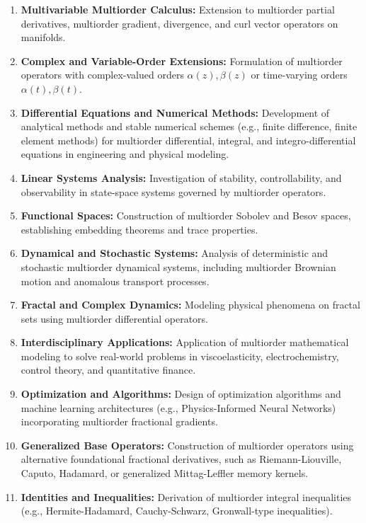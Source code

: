 \documentclass[oneside,10pt]{article}
\theoremstyle{plain}
\theoremstyle{definition}
\begin{document}
\begin{enumerate}
    \item \textbf{Multivariable Multiorder Calculus:} Extension to multiorder partial derivatives, multiorder gradient, divergence, and curl vector operators on manifolds.
    \item \textbf{Complex and Variable-Order Extensions:} Formulation of multiorder operators with complex-valued orders $\alpha(z), \beta(z)$ or time-varying orders $\alpha(t), \beta(t)$.
    \item \textbf{Differential Equations and Numerical Methods:} Development of analytical methods and stable numerical schemes (e.g., finite difference, finite element methods) for multiorder differential, integral, and integro-differential equations in engineering and physical modeling.
    \item \textbf{Linear Systems Analysis:} Investigation of stability, controllability, and observability in state-space systems governed by multiorder operators.
    \item \textbf{Functional Spaces:} Construction of multiorder Sobolev and Besov spaces, establishing embedding theorems and trace properties.
    \item \textbf{Dynamical and Stochastic Systems:} Analysis of deterministic and stochastic multiorder dynamical systems, including multiorder Brownian motion and anomalous transport processes.
    \item \textbf{Fractal and Complex Dynamics:} Modeling physical phenomena on fractal sets using multiorder differential operators.
    \item \textbf{Interdisciplinary Applications:} Application of multiorder mathematical modeling to solve real-world problems in viscoelasticity, electrochemistry, control theory, and quantitative finance.
    \item \textbf{Optimization and Algorithms:} Design of optimization algorithms and machine learning architectures (e.g., Physics-Informed Neural Networks) incorporating multiorder fractional gradients.
    \item \textbf{Generalized Base Operators:} Construction of multiorder operators using alternative foundational fractional derivatives, such as Riemann-Liouville, Caputo, Hadamard, or generalized Mittag-Leffler memory kernels.
    \item \textbf{Identities and Inequalities:} Derivation of multiorder integral inequalities (e.g., Hermite-Hadamard, Cauchy-Schwarz, Gronwall-type inequalities).
\end{enumerate}
\end{document}
